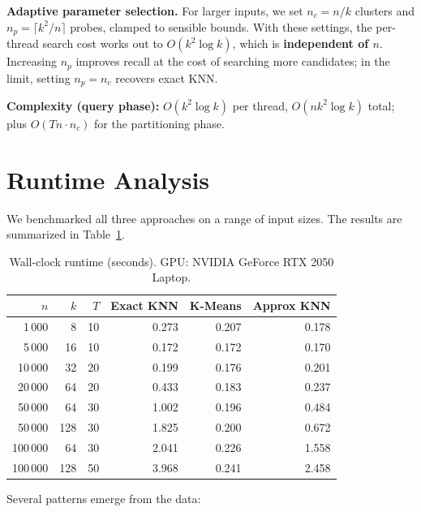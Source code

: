 \documentclass[11pt,a4paper]{article}
\begin{document}
\textbf{Adaptive parameter selection.}
For larger inputs, we set $n_c = n/k$ clusters and $n_p = \lceil k^2/n \rceil$ probes, clamped to sensible bounds.
With these settings, the per-thread search cost works out to $O(k^2 \log k)$, which is \textbf{independent of $n$}.
Increasing $n_p$ improves recall at the cost of searching more candidates; in the limit, setting $n_p = n_c$ recovers exact KNN.

\textbf{Complexity (query phase):} $O(k^2 \log k)$ per thread, $O(nk^2 \log k)$ total; plus $O(Tn \cdot n_c)$ for the partitioning phase.

\section{Runtime Analysis}

We benchmarked all three approaches on a range of input sizes. The results are summarized in Table~\ref{tab:bench}.

\begin{table}[h]
\centering
\caption{Wall-clock runtime (seconds). GPU: NVIDIA GeForce RTX 2050 Laptop.}
\label{tab:bench}
\small
\renewcommand{\arraystretch}{1.2}
\begin{tabular}{@{}rrr|rrr@{}}
\toprule
$n$ & $k$ & $T$ & \textbf{Exact KNN} & \textbf{K-Means} & \textbf{Approx KNN} \\
\midrule
  1\,000 &   8 & 10 & 0.273 & 0.207 & 0.178 \\
  5\,000 &  16 & 10 & 0.172 & 0.172 & 0.170 \\
 10\,000 &  32 & 20 & 0.199 & 0.176 & 0.201 \\
 20\,000 &  64 & 20 & 0.433 & 0.183 & 0.237 \\
 50\,000 &  64 & 30 & 1.002 & 0.196 & 0.484 \\
 50\,000 & 128 & 30 & 1.825 & 0.200 & 0.672 \\
100\,000 &  64 & 30 & 2.041 & 0.226 & 1.558 \\
100\,000 & 128 & 50 & 3.968 & 0.241 & 2.458 \\
\bottomrule
\end{tabular}
\end{table}

Several patterns emerge from the data:
\end{document}
